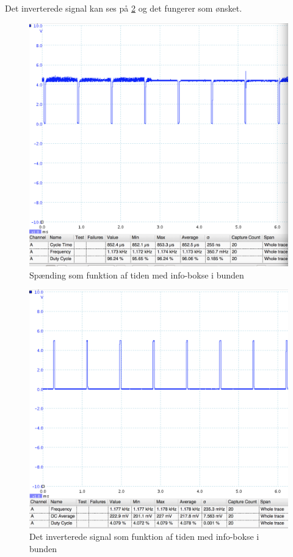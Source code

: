 Det inverterede signal kan ses på \ref{fig:555inv} og det fungerer som ønsket.
\begin{figure}[H]
	\centering
    \includegraphics[width=13cm]{figures/2_4_3hastighed/555signal.png}
	\caption{Spænding som funktion af tiden med info-bokse i bunden}
	\label{fig:555noninv}
\end{figure}

\begin{figure}[H]
	\centering
    \includegraphics[width=13cm]{figures/2_4_3hastighed/555signalinv.png}
	\caption{Det inverterede signal som funktion af tiden med info-bokse i bunden}
	\label{fig:555inv}
\end{figure}


